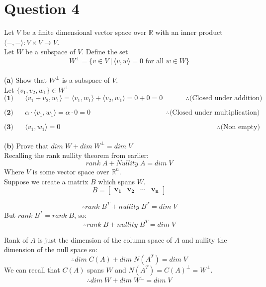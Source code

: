 \documentclass[12pt]{article}
\begin{document}
\section*{Question 4}
Let $V$ be a finite dimensional vector space over $\mathbb{R}$ with an inner product $\langle-,-\rangle : V \times V \rightarrow V$.\\
Let $W$ be a subspace of $V$. Define the set\\
$$
W^\bot=\{v \in V \: | \: \langle v,w \rangle = 0 \text{ for all } w \in W \}
$$\\
\medskip
(\textbf{a}) Show that $W^\bot$ is a subspace of $V$.\\
\medskip
Let $\{v_1,v_2,w_1\}\in   W^\bot$
$$
\textbf{(1)}
\hspace{20pt}
\langle
v_1 + v_2, w_1
\rangle
=
\langle
v_1, w_1
\rangle
+
\langle
v_2, w_1
\rangle
=
0+0=0
\hspace{40pt}
\therefore
\text{(Closed under addition)}
$$

$$
\textbf{(2)}
\hspace{20pt}
\alpha \cdot \langle v_1, w_1 \rangle = \alpha \cdot 0 = 0 \hspace{130pt} \therefore \text{(Closed under multiplication)}
$$

$$
\textbf{(3)}
\hspace{20pt}
\langle v_1, w_1 \rangle = 0 \hspace{270pt} \therefore \text{(Non empty)}
$$ \\
\medskip
(\textbf{b}) Prove that $dim\;W + dim\;W^\bot = dim\;V$ \\
\medskip
Recalling the rank nullity theorem from earlier:
$$
	rank\;A+Nullity\;A=dim\;V
$$
Where $V$ is some vector space over $\mathbb{R}^n$.\\
Suppose we create a matrix $B$ which spans $W$.
$$
	B=
	\begin{bmatrix}
		\mathbf{v_1} & \mathbf{v_2} & \cdots & \mathbf{v_n} 	
	\end{bmatrix}
$$

$$
	\therefore rank\;B^T+nullity\;B^T=dim\;V
$$
But $rank\;B^T=rank\;B$, so:\\
$$
	\therefore rank\;B +nullity\;B^T=dim\;V
$$

Rank of $A$ is just the dimension of the column space of $A$ and nullity the dimension of the null space so:\\
$$
	\therefore dim\;C(A)+dim\;N(A^T)=dim\;V
$$
We can recall that $C(A)$ spans $W$ and $N(A^T)=C(A)^\bot=W^\bot$.
$$
	\therefore dim\; W + dim\;W^\bot =dim \; V
$$
\end{document}
